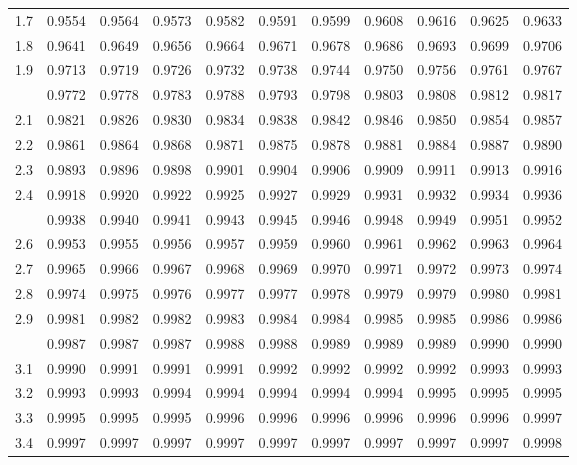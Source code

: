 \documentclass[]{article}
\begin{document}
\begin{table}[H]
\begin{tabular}{lrrrrrrrrrr}
1.7 & 0.9554 & 0.9564 & 0.9573 & 0.9582 & 0.9591 & 0.9599 & 0.9608 & 0.9616 & 0.9625 & 0.9633\\
1.8 & 0.9641 & 0.9649 & 0.9656 & 0.9664 & 0.9671 & 0.9678 & 0.9686 & 0.9693 & 0.9699 & 0.9706\\
1.9 & 0.9713 & 0.9719 & 0.9726 & 0.9732 & 0.9738 & 0.9744 & 0.9750 & 0.9756 & 0.9761 & 0.9767\\
\addlinespace
2.0 & 0.9772 & 0.9778 & 0.9783 & 0.9788 & 0.9793 & 0.9798 & 0.9803 & 0.9808 & 0.9812 & 0.9817\\
2.1 & 0.9821 & 0.9826 & 0.9830 & 0.9834 & 0.9838 & 0.9842 & 0.9846 & 0.9850 & 0.9854 & 0.9857\\
2.2 & 0.9861 & 0.9864 & 0.9868 & 0.9871 & 0.9875 & 0.9878 & 0.9881 & 0.9884 & 0.9887 & 0.9890\\
2.3 & 0.9893 & 0.9896 & 0.9898 & 0.9901 & 0.9904 & 0.9906 & 0.9909 & 0.9911 & 0.9913 & 0.9916\\
2.4 & 0.9918 & 0.9920 & 0.9922 & 0.9925 & 0.9927 & 0.9929 & 0.9931 & 0.9932 & 0.9934 & 0.9936\\
\addlinespace
2.5 & 0.9938 & 0.9940 & 0.9941 & 0.9943 & 0.9945 & 0.9946 & 0.9948 & 0.9949 & 0.9951 & 0.9952\\
2.6 & 0.9953 & 0.9955 & 0.9956 & 0.9957 & 0.9959 & 0.9960 & 0.9961 & 0.9962 & 0.9963 & 0.9964\\
2.7 & 0.9965 & 0.9966 & 0.9967 & 0.9968 & 0.9969 & 0.9970 & 0.9971 & 0.9972 & 0.9973 & 0.9974\\
2.8 & 0.9974 & 0.9975 & 0.9976 & 0.9977 & 0.9977 & 0.9978 & 0.9979 & 0.9979 & 0.9980 & 0.9981\\
2.9 & 0.9981 & 0.9982 & 0.9982 & 0.9983 & 0.9984 & 0.9984 & 0.9985 & 0.9985 & 0.9986 & 0.9986\\
\addlinespace
3.0 & 0.9987 & 0.9987 & 0.9987 & 0.9988 & 0.9988 & 0.9989 & 0.9989 & 0.9989 & 0.9990 & 0.9990\\
3.1 & 0.9990 & 0.9991 & 0.9991 & 0.9991 & 0.9992 & 0.9992 & 0.9992 & 0.9992 & 0.9993 & 0.9993\\
3.2 & 0.9993 & 0.9993 & 0.9994 & 0.9994 & 0.9994 & 0.9994 & 0.9994 & 0.9995 & 0.9995 & 0.9995\\
3.3 & 0.9995 & 0.9995 & 0.9995 & 0.9996 & 0.9996 & 0.9996 & 0.9996 & 0.9996 & 0.9996 & 0.9997\\
3.4 & 0.9997 & 0.9997 & 0.9997 & 0.9997 & 0.9997 & 0.9997 & 0.9997 & 0.9997 & 0.9997 & 0.9998\\
\bottomrule
\end{tabular}
\end{table}
\end{document}
